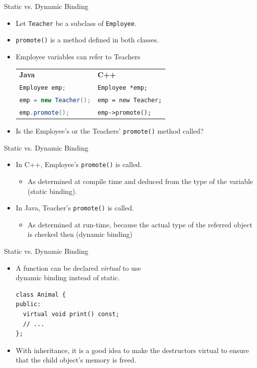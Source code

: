\documentclass[14pt, aspectratio=1610, hyperref={pdfpagelayout=SinglePage}]{beamer}
\begin{document}
\begin{frame}{Static vs. Dynamic Binding}
\begin{itemize}
\item Let \texttt{Teacher} be a subclass of \texttt{Employee}. \\
\item \lstinline{promote()} is a method defined in both classes.
\item Employee variables can refer to Teachers
  \begin{tabular}{l @{\hskip 4em} l}
    \textbf{Java} & \textbf{C++}\\
    \rowcolor{codeBackground}\lstinline[language=Java]{Employee emp;} & \lstinline{Employee *emp;}\\
    \rowcolor{codeBackground}\lstinline[language=Java]{emp = new Teacher();} & \lstinline{emp = new Teacher;}\\
    \rowcolor{codeBackground}\lstinline[language=Java]{emp.promote();} & \lstinline{emp->promote();}\\
  \end{tabular}
\item Is the Employee's or the Teachers' \lstinline{promote()} method called?
\end{itemize}
\end{frame}

\begin{frame}{Static vs. Dynamic Binding}
\begin{itemize}
\item In C++, Employee's \lstinline{promote()} is called.
\begin{itemize}
\item As determined at compile time and deduced from the type of the variable (static binding).
\end{itemize}
\item In Java, Teacher's \lstinline{promote()} is called.
\begin{itemize}
\item As determined at run-time, because the actual type of the referred object is checked then (dynamic binding)
\end{itemize}
\end{itemize}
\end{frame}

\begin{frame}[fragile]{Static vs. Dynamic Binding}
\begin{itemize}[<+->]
\item
  A function can be declared \textit{virtual} to use \\dynamic binding instead of static.\\
  \begin{lstlisting}
class Animal {
public:
  virtual void print() const;
  // ...
};\end{lstlisting}
\item
  With inheritance, it is a good idea to make the destructors virtual to ensure that the child object's memory is freed.
\end{itemize}
\end{frame}
\end{document}
